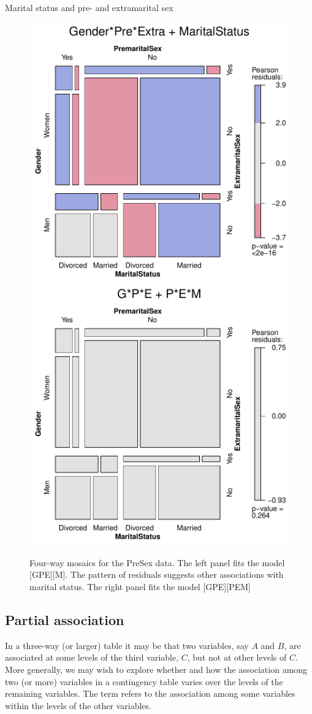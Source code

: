 \documentclass[10pt,krantz2]{krantz}\usepackage[]{graphicx}\usepackage[]{color}
\newenvironment{knitrout}{}{} %
\renewenvironment{knitrout}{\small\renewcommand{\baselinestretch}{.85}}{} %
\begin{document}
\begin{Example}[marital1]{Marital status and pre- and extramarital sex}
\begin{knitrout}
\begin{figure}[!htbp]
\centerline{\includegraphics[width=.49\textwidth]{ch05/fig/presex3-1} 
\includegraphics[width=.49\textwidth]{ch05/fig/presex3-2} }

\caption[Four-way mosaics for the PreSex data]{Four-way mosaics for the PreSex data. The left panel fits the model [GPE][M]. The pattern of residuals suggests other associations with marital status. The right panel fits the model [GPE][PEM]}\label{fig:presex3}
\end{figure}


\end{knitrout}

\end{Example}


\subsection{Partial association}\label{sec:mospart}

In a three-way (or larger) table it may be that two variables, say $A$ and $B$, are
associated at some levels of the third variable, $C$, but not at other
levels of $C$. More generally, we may wish to explore whether and how the
association among two (or more) variables in a contingency table varies over
the levels of the remaining variables. The term  refers
to the association among some variables within the levels of the other
variables.
\end{document}
